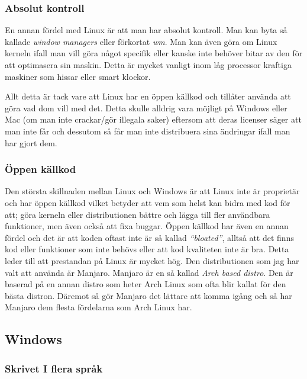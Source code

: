 \documentclass[12pt, a4paper]{report}
\begin{document}
    \subsubsection{Absolut kontroll}

   En annan fördel med Linux är att man har absolut kontroll. Man kan byta så kallade \textit{window managers} eller förkortat \textit{wm}\cite{wm}. Man kan även göra om Linux kerneln ifall man vill göra något specifik eller kanske inte behöver bitar av den för att optimasera sin maskin. Detta är mycket vanligt inom låg processor kraftiga maskiner som hissar eller smart klockor.

   Allt detta är tack vare att Linux har en öppen källkod och tillåter använda att göra vad dom vill med det. Detta skulle alldrig vara möjligt på Windows eller Mac (om man inte crackar/gör illegala saker) eftersom att deras licenser säger att man inte får och dessutom så får man inte distribuera sina ändringar ifall man har gjort dem.

   \subsubsection{Öppen källkod}


   Den största skillnaden mellan Linux och Windows är att Linux inte är proprietär och har öppen källkod vilket betyder att vem som helst kan bidra med kod för att; göra kerneln eller distributionen bättre och lägga till fler användbara funktioner, men även också att fixa buggar. Öppen källkod har även en annan fördel och det är att koden oftast inte är så kallad \textit{``bloated''}, alltså att det finns kod eller funktioner som inte behövs eller att kod kvaliteten inte är bra. Detta leder till att prestandan på Linux är mycket hög.
    \vspace{1cm}
   Den distributionen som jag har valt att använda är Manjaro\cite{manjaro}. Manjaro är en så kallad \textit{Arch based distro}. Den är baserad på en annan distro som heter Arch Linux som ofta blir kallat för den bästa distron. Däremot så gör Manjaro det lättare att komma igång och så har Manjaro dem flesta fördelarna som Arch Linux har.

   \subsection{Windows}


    \subsubsection{Skrivet I flera språk}
    
\end{document}
